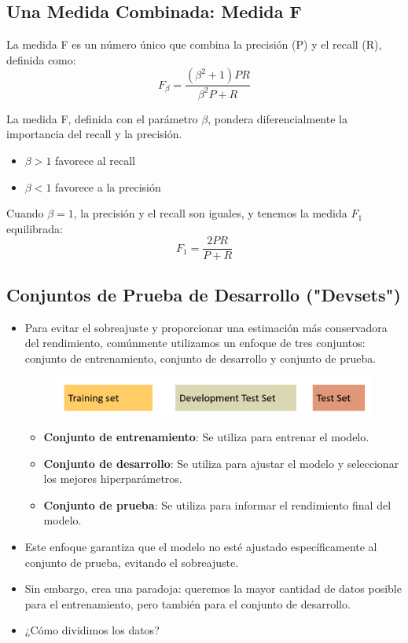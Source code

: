 \subsection{Una Medida Combinada: Medida F}
La medida F es un número único que combina la precisión (P) y el recall (R), definida como:
\[
F_\beta = \frac{(\beta^2+1)PR}{\beta^2P + R}
\]

La medida F, definida con el parámetro $\beta$, pondera diferencialmente la importancia del recall y la precisión.
\begin{itemize}
  \item $\beta > 1$ favorece al recall
  \item $\beta < 1$ favorece a la precisión
\end{itemize}

Cuando $\beta = 1$, la precisión y el recall son iguales, y tenemos la medida $F_1$ equilibrada:
\[
F_1 = \frac{2PR}{P + R}
\]

\subsection{Conjuntos de Prueba de Desarrollo ("Devsets")}

\begin{itemize}
 \item Para evitar el sobreajuste y proporcionar una estimación más conservadora del rendimiento, comúnmente utilizamos un enfoque de tres conjuntos: conjunto de entrenamiento, conjunto de desarrollo y conjunto de prueba.
\begin{figure}[h]
\includegraphics[scale = 0.23]{pics/devsets.png}
\end{figure}

\begin{itemize}
\item \textbf{Conjunto de entrenamiento}: Se utiliza para entrenar el modelo.
\item \textbf{Conjunto de desarrollo}: Se utiliza para ajustar el modelo y seleccionar los mejores hiperparámetros.
\item \textbf{Conjunto de prueba}: Se utiliza para informar el rendimiento final del modelo.
\end{itemize}

\item Este enfoque garantiza que el modelo no esté ajustado específicamente al conjunto de prueba, evitando el sobreajuste.
\item Sin embargo, crea una paradoja: queremos la mayor cantidad de datos posible para el entrenamiento, pero también para el conjunto de desarrollo.
\item ¿Cómo dividimos los datos?

\end{itemize}





